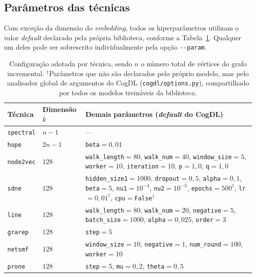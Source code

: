 \documentclass[12pt,a4paper]{article}
\begin{document}
\subsection{Parâmetros das técnicas}

Com exceção da dimensão do \textit{embedding}, todos os hiperparâmetros
utilizam o valor \textit{default} declarado pela própria biblioteca,
conforme a Tabela~\ref{tab:defaults}. Qualquer um deles pode ser
sobrescrito individualmente pela opção \texttt{-{}-param}.

\begin{table}[htbp]
\centering
\small
\begin{tabularx}{\textwidth}{@{}l l X@{}}
\toprule
\textbf{Técnica} & \textbf{Dimensão $k$} & \textbf{Demais parâmetros (\textit{default} do CogDL)} \\
\midrule
\texttt{spectral} & $n-1$  & --- \\
\texttt{hope}     & $2n-1$ & \texttt{beta}$=0{,}01$ \\
\texttt{node2vec} & $128$  & \texttt{walk\_length}$=80$, \texttt{walk\_num}$=40$,
                             \texttt{window\_size}$=5$, \texttt{worker}$=10$,
                             \texttt{iteration}$=10$, \texttt{p}$=1{,}0$, \texttt{q}$=1{,}0$ \\
\texttt{sdne}     & $128$  & \texttt{hidden\_size1}$=1000$, \texttt{dropout}$=0{,}5$,
                             \texttt{alpha}$=0{,}1$, \texttt{beta}$=5$,
                             \texttt{nu1}$=10^{-4}$, \texttt{nu2}$=10^{-3}$,
                             \texttt{epochs}$=500^{\dagger}$, \texttt{lr}$=0{,}01^{\dagger}$,
                             \texttt{cpu}$=$\texttt{False}$^{\dagger}$ \\
\texttt{line}     & $128$  & \texttt{walk\_length}$=80$, \texttt{walk\_num}$=20$,
                             \texttt{negative}$=5$, \texttt{batch\_size}$=1000$,
                             \texttt{alpha}$=0{,}025$, \texttt{order}$=3$ \\
\texttt{grarep}   & $128$  & \texttt{step}$=5$ \\
\texttt{netsmf}   & $128$  & \texttt{window\_size}$=10$, \texttt{negative}$=1$,
                             \texttt{num\_round}$=100$, \texttt{worker}$=10$ \\
\texttt{prone}    & $128$  & \texttt{step}$=5$, \texttt{mu}$=0{,}2$, \texttt{theta}$=0{,}5$ \\
\bottomrule
\end{tabularx}
\caption{Configuração adotada por técnica, sendo $n$ o número total de
vértices do grafo incremental. $^{\dagger}$Parâmetros que não são
declarados pelo próprio modelo, mas pelo analisador global de argumentos
do CogDL (\texttt{cogdl/options.py}), compartilhado por todos os modelos
treináveis da biblioteca.}
\label{tab:defaults}
\end{table}
\end{document}
